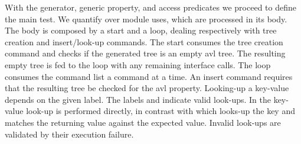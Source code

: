 With the generator, generic property, and access predicates we proceed to
define the %
main test.
%
We quantify over module uses, which are processed in its body.
%
The body is composed by a start and a loop, dealing respectively with
 tree creation and insert/look-up commands.
%
The start consumes the tree creation command and checks if the generated
tree is an empty avl tree.
%
The resulting empty tree is fed to the loop with any remaining interface
calls.
%
The loop consumes the command list a command at a time.
%
An insert command requires that the resulting tree be checked for the
avl property.
%
%
Looking-up a key-value depends on the given label.
%
The labels  and  indicate valid look-ups.
%
In  the key-value look-up is performed directly, in contrast
with  which looks-up the key and matches the returning value
against the expected value.
%
Invalid look-ups are validated by their execution failure.
